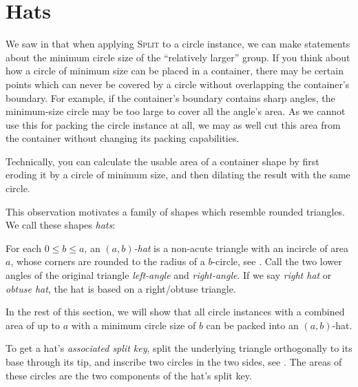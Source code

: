 \documentclass[a4paper,style=print,bibliography=totoc,nexus,lnum,extramargin]{tubsbook}
\begin{document}
\section{Hats}

We saw in  that when applying \textsc{Split} to a circle instance, we can make statements about the minimum circle size of the “relatively larger” group.
If you think about how a circle of minimum size can be placed in a container, there may be certain points which can never be covered by a circle without overlapping the container's boundary. For example, if the container's boundary contains sharp angles, the minimum-size circle may be too large to cover all the angle's area. As we cannot use this for packing the circle instance at all, we may as well cut this area from the container without changing its packing capabilities.

Technically, you can calculate the usable area of a container shape by first eroding it by a circle of minimum size, and then dilating the result with the same circle.

This observation motivates a family of shapes which resemble rounded triangles. We call these shapes \emph{hats}:

\begin{definition}
    For each $0 \le b \le a$, an \emph{$(a,b)$-hat} is a non-acute triangle with an incircle of area $a$, whose corners are rounded to the radius of a $b$-circle, see .
    Call the two lower angles of the original triangle \emph{left-angle} and \emph{right-angle}.
    If we say \emph{right hat} or \emph{obtuse hat}, the hat is based on a right/obtuse triangle.
\end{definition}

\newcommand\defaulta{30}
\newcommand\defaultb{40}
\newcommand\defaultr{0.2}
\newcommand\defaultx{0.7}


In the rest of this section, we will show that all circle instances with a combined area of up to $a$ with a minimum circle size of $b$ can be packed into an $(a,b)$-hat.

\begin{definition}\label{def:hat-split-key}
    To get a hat's \emph{associated split key}, split the underlying triangle orthogonally to its base through its tip, and inscribe two circles in the two sides, see . The areas of these circles are the two components of the hat's split key.
\end{definition}
\end{document}
